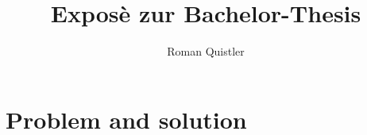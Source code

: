 \documentclass[a4paper, 11pt]{scrartcl}
\title{Exposè zur Bachelor-Thesis}
\author{Roman Quistler}
\begin{document}
	
	
	
	\newpage
	\tableofcontents
	\newpage
	
	
	
	\section{Problem and solution}
	\label{sec:problem-solution}
	
	
	
	

	

	\newpage

	

	\newpage

	
	
	\newpage
	
	\begin{appendix}
		\listoffigures
	\end{appendix}
	
	\printbibliography[type=online,title={Online References}]
	
\end{document}
